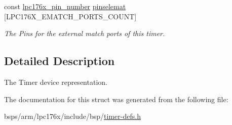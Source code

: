 \begin{DoxyCompactItemize}
\mbox{\label{structlpc176x__timer_aef47983d183409f59f4e10cd1ce7b040}} 
const \mbox{\hyperlink{common-types_8h_a8215ced1557c43bc5925b691a3c1dc23}{lpc176x\+\_\+pin\+\_\+number}} \mbox{\hyperlink{structlpc176x__timer_aef47983d183409f59f4e10cd1ce7b040}{pinselemat}} \mbox{[}L\+P\+C176\+X\+\_\+\+E\+M\+A\+T\+C\+H\+\_\+\+P\+O\+R\+T\+S\+\_\+\+C\+O\+U\+NT\mbox{]}
\begin{DoxyCompactList}\small\item\em The Pins for the external match ports of this timer. \end{DoxyCompactList}\end{DoxyCompactItemize}


\subsection{Detailed Description}
The Timer device representation. 

The documentation for this struct was generated from the following file\+:\begin{DoxyCompactItemize}
\item 
bsps/arm/lpc176x/include/bsp/\mbox{\hyperlink{timer-defs_8h}{timer-\/defs.\+h}}\end{DoxyCompactItemize}
